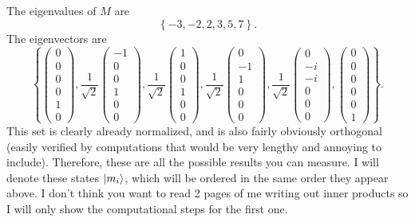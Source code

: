 \documentclass[11pt, letterpaper]{article}
\begin{document}
\begin{enumerate}
		The eigenvalues of $M$ are
		\[
			\left\{ -3,-2,2,3,5,7 \right\} 
		.\]
		The eigenvectors are
		\[
			\left\{ \begin{pmatrix}
			0 \\
			0 \\
			0 \\
			0 \\
			1 \\
			0
			\end{pmatrix},\frac{1}{\sqrt{2} } \begin{pmatrix}
			-1 \\
			0 \\
			0  \\
			1  \\
			0 \\
			0
			\end{pmatrix},\frac{1}{\sqrt{2} } \begin{pmatrix}
			1 \\
			0 \\
			0 \\
			1  \\
			0 \\
			0
			\end{pmatrix},\frac{1}{\sqrt{2} } \begin{pmatrix}
			0  \\
			-1  \\
			1 \\
			0 \\
			0 \\
			0
			\end{pmatrix}, \frac{1}{\sqrt{2} } \begin{pmatrix}
			0\\
			-i  \\
			-i \\
			0 \\
			0 \\
			0
			\end{pmatrix},\begin{pmatrix}
			0 \\
			0 \\
			0 \\
			0 \\
			0 \\
			1
			\end{pmatrix} \right\} 
		.\]
		This set is clearly already normalized, and is also fairly obviously orthogonal (easily verified by computations that would be very lengthy and annoying to include). Therefore, these are all the possible results you can measure. I will denote these states $\lvert m_i\rangle $, which will be ordered in the same order they appear above. I don't think you want to read 2 pages of me writing out inner products so I will only show the computational steps for the first one.

\end{enumerate}
\end{document}
